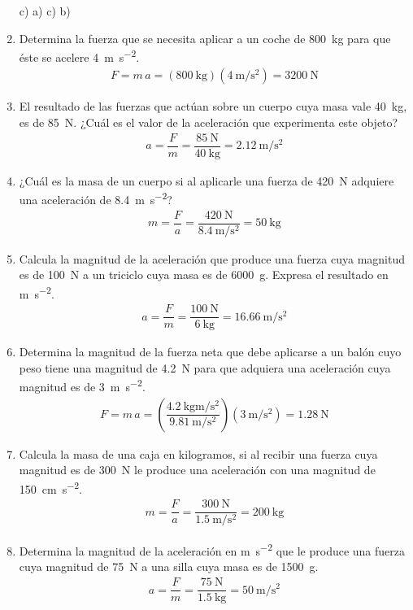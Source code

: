 \documentclass[14pt]{extarticle}
\begin{document}
\begin{enumerate}
c) \quad a) \quad c) \quad b)
\item Determina la fuerza que se necesita aplicar a un coche de \SI{800}{\kilo\gram} para que éste se acelere \SI{4}{\meter\per\square\second}.
\begin{align*}
F = m \, a = (\SI{800}{\kilo\gram})(\SI{4}{\meter\per\square\second}) = \SI{3200}{\newton}
\end{align*}
\item El resultado de las fuerzas que actúan sobre un cuerpo cuya masa vale \SI{40}{\kilo\gram}, es de \SI{85}{\newton}. ¿Cuál es el valor de la aceleración que experimenta este objeto?
\begin{align*}
a = \dfrac{F}{m} = \dfrac{\SI{85}{\newton}}{\SI{40}{\kilo\gram}} = \SI{2.12}{\meter\per\square\second}
\end{align*}    
\item ¿Cuál es la masa de un cuerpo si al aplicarle una fuerza de \SI{420}{\newton} adquiere una aceleración de \SI{8.4}{\meter\per\square\second}?
\begin{align*}
m = \dfrac{F}{a} = \dfrac{\SI{420}{\newton}}{\SI{8.4}{\meter\per\square\second}} = \SI{50}{\kilogram}
\end{align*}
\item Calcula la magnitud de la aceleración que produce una fuerza cuya magnitud es de \SI{100}{\newton} a un triciclo cuya masa es de \SI{6000}{\gram}. Expresa el resultado en \unit{\meter\per\square\second}.
\begin{align*}
a = \dfrac{F}{m} = \dfrac{\SI{100}{\newton}}{\SI{6}{\kilo\gram}} = \SI{16.66}{\meter\per\square\second}
\end{align*}
\item Determina la magnitud de la fuerza neta que debe aplicarse a un balón cuyo peso tiene una magnitud de
\SI{4.2}{\newton} para que adquiera una aceleración cuya magnitud es de \SI{3}{\meter\per\square\second}.
\begin{align*}
F = m \, a = (\dfrac{\SI{4.2}{\kilo\gram\meter\per\square\second}}{\SI{9.81}{\meter\per\square\second}} )(\SI{3}{\meter\per\square\second}) = \SI{1.28}{\newton}
\end{align*}    
\item Calcula la masa de una caja en kilogramos, si al recibir una fuerza cuya magnitud es de \SI{300}{\newton} le produce una aceleración con una magnitud de \SI{150}{\centi\meter\per\square\second}.
\begin{align*}
m = \dfrac{F}{a} = \dfrac{\SI{300}{\newton}}{\SI{1.5}{\meter\per\square\second}} = \SI{200}{\kilogram}
\end{align*}    
\item Determina la magnitud de la aceleración en \unit{\meter\per\square\second} que le produce una fuerza cuya magnitud de \SI{75}{\newton} a una silla cuya masa es de \SI{1500}{\gram}.
\begin{align*}
a = \dfrac{F}{m} = \dfrac{\SI{75}{\newton}}{\SI{1.5}{\kilo\gram}} = \SI{50}{\meter\per\square\second}
\end{align*}    
\end{enumerate}
\end{document}
